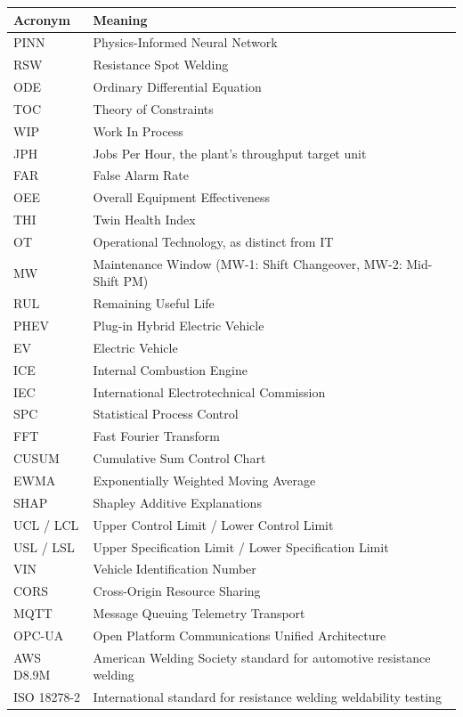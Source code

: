 \documentclass[11pt]{article}
\begin{document}
\begin{center}
\small
\begin{longtable}{p{2.2cm}p{9.5cm}}
\toprule
\textbf{Acronym} & \textbf{Meaning} \\
\midrule
\endhead
PINN & Physics-Informed Neural Network \\
RSW & Resistance Spot Welding \\
ODE & Ordinary Differential Equation \\
TOC & Theory of Constraints \\
WIP & Work In Process \\
JPH & Jobs Per Hour, the plant's throughput target unit \\
FAR & False Alarm Rate \\
OEE & Overall Equipment Effectiveness \\
THI & Twin Health Index \\
OT & Operational Technology, as distinct from IT \\
MW & Maintenance Window (MW-1: Shift Changeover, MW-2: Mid-Shift PM) \\
RUL & Remaining Useful Life \\
PHEV & Plug-in Hybrid Electric Vehicle \\
EV & Electric Vehicle \\
ICE & Internal Combustion Engine \\
IEC & International Electrotechnical Commission \\
SPC & Statistical Process Control \\
FFT & Fast Fourier Transform \\
CUSUM & Cumulative Sum Control Chart \\
EWMA & Exponentially Weighted Moving Average \\
SHAP & Shapley Additive Explanations \\
UCL / LCL & Upper Control Limit / Lower Control Limit \\
USL / LSL & Upper Specification Limit / Lower Specification Limit \\
VIN & Vehicle Identification Number \\
CORS & Cross-Origin Resource Sharing \\
MQTT & Message Queuing Telemetry Transport \\
OPC-UA & Open Platform Communications Unified Architecture \\
AWS D8.9M & American Welding Society standard for automotive resistance welding \\
ISO 18278-2 & International standard for resistance welding weldability testing \\
\bottomrule
\end{longtable}
\end{center}
\end{document}
